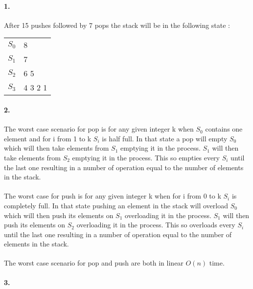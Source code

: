 

\paragraph{1.} 
\paragraph{}
After 15 pushes followed by 7 pops the stack will be in the following state :

\begin{tabular}{rl}
$S_0$ & 8 \\
$S_1$ & 7 \\
$S_2$ & 6 5 \\
$S_3$ & 4 3 2 1 \\
\end{tabular}


\paragraph{2.} 
\paragraph{}
The worst case scenario for pop is for any given integer k when $S_0$ contains one element and for i from 1 to k $S_i$ is half full. In that state a pop will empty $S_0$ which will then take elements from $S_1$ emptying it in the process. $S_1$ will then take elements from $S_2$ emptying it in the process. This so empties every $S_i$ until the last one resulting in a number of operation equal to the number of elements in the stack.
\paragraph{}
The worst case for push is for any given integer k when for i from 0 to k $S_i$ is completely full. In that state pushing an element in the stack will overload $S_0$ which will then push its elements on $S_1$ overloading it in the process. $S_1$ will then push its elements on $S_2$ overloading it in the process. This so overloads every $S_i$ until the last one resulting in a number of operation equal to the number of elements in the stack.
\paragraph{}
The worst case scenario for pop and push are both in linear $O(n)$ time.


\paragraph{3.} 
